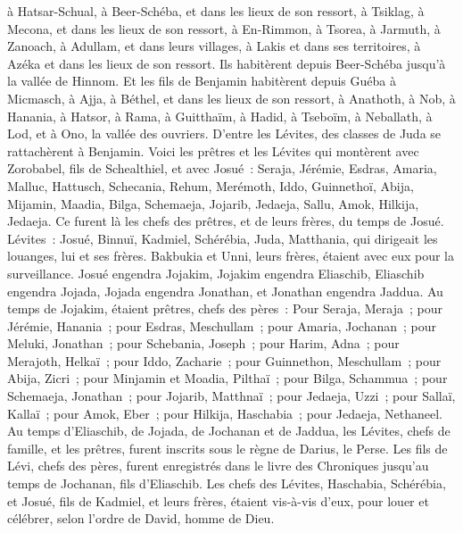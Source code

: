 \begin{multicols}{2}
à Hatsar-Schual, à Beer-Schéba, et dans les lieux de son ressort,
à Tsiklag, à Mecona, et dans les lieux de son ressort,
à En-Rimmon, à Tsorea, à Jarmuth,
à Zanoach, à Adullam, et dans leurs villages, à Lakis et dans ses territoires, à Azéka et dans les lieux de son ressort. Ils habitèrent depuis Beer-Schéba jusqu'à la vallée de Hinnom.
Et les fils de Benjamin habitèrent depuis Guéba à Micmasch, à Ajja, à Béthel, et dans les lieux de son ressort,
à Anathoth, à Nob, à Hanania,
à Hatsor, à Rama, à Guitthaïm,
à Hadid, à Tseboïm, à Neballath,
à Lod, et à Ono, la vallée des ouvriers.
D'entre les Lévites, des classes de Juda se rattachèrent à Benjamin.
\VerseOne{}Voici les prêtres et les Lévites qui montèrent avec Zorobabel, fils de Schealthiel, et avec Josué~: Seraja, Jérémie, Esdras,
Amaria, Malluc, Hattusch,
Schecania, Rehum, Merémoth,
Iddo, Guinnethoï, Abija,
Mijamin, Maadia, Bilga,
Schemaeja, Jojarib, Jedaeja,
Sallu, Amok, Hilkija, Jedaeja. Ce furent là les chefs des prêtres, et de leurs frères, du temps de Josué.
Lévites~: Josué, Binnuï, Kadmiel, Schérébia, Juda, Matthania, qui dirigeait les louanges, lui et ses frères.
Bakbukia et Unni, leurs frères, étaient avec eux pour la surveillance.
Josué engendra Jojakim, Jojakim engendra Eliaschib, Eliaschib engendra Jojada,
Jojada engendra Jonathan, et Jonathan engendra Jaddua.
Au temps de Jojakim, étaient prêtres, chefs des pères~: Pour Seraja, Meraja~; pour Jérémie, Hanania~;
pour Esdras, Meschullam~; pour Amaria, Jochanan~;
pour Meluki, Jonathan~; pour Schebania, Joseph~;
pour Harim, Adna~; pour Merajoth, Helkaï~;
pour Iddo, Zacharie~; pour Guinnethon, Meschullam~;
pour Abija, Zicri~; pour Minjamin et Moadia, Pilthaï~;
pour Bilga, Schammua~; pour Schemaeja, Jonathan~;
pour Jojarib, Matthnaï~; pour Jedaeja, Uzzi~;
pour Sallaï, Kallaï~; pour Amok, Eber~;
pour Hilkija, Haschabia~; pour Jedaeja, Nethaneel.
Au temps d'Eliaschib, de Jojada, de Jochanan et de Jaddua, les Lévites, chefs de famille, et les prêtres, furent inscrits sous le règne de Darius, le Perse.
Les fils de Lévi, chefs des pères, furent enregistrés dans le livre des Chroniques jusqu'au temps de Jochanan, fils d'Eliaschib.
Les chefs des Lévites, Haschabia, Schérébia, et Josué, fils de Kadmiel, et leurs frères, étaient vis-à-vis d'eux, pour louer et célébrer, selon l'ordre de David, homme de Dieu.

\end{multicols}
